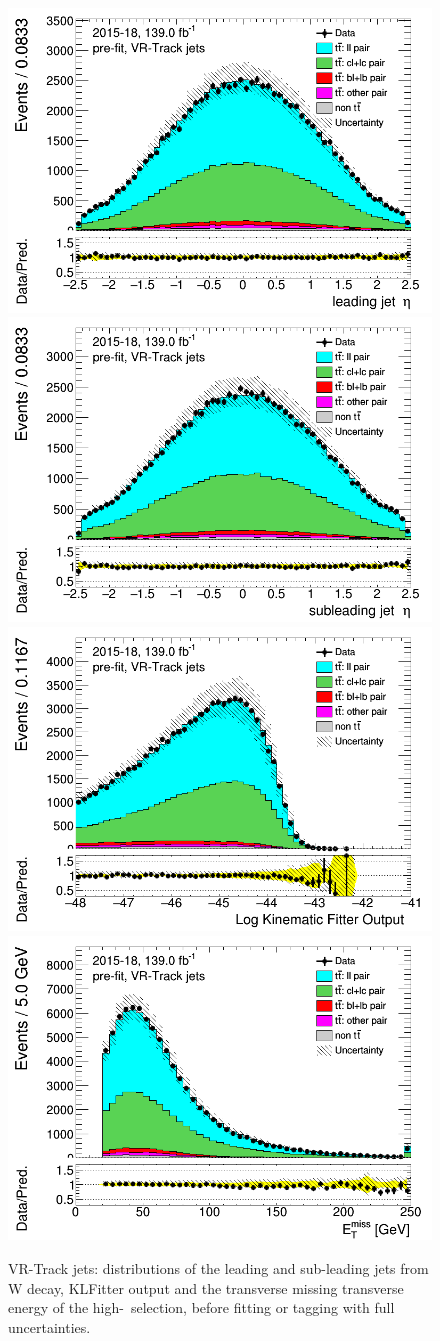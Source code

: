 \newpage	
\begin{figure}[H]
\includegraphics[width=.45\textwidth]{FTAG_plots/pretagNoRwnewonlyVRJetsall/DataMC_h_J0_etatrackjet.png}
\includegraphics[width=.45\textwidth]{FTAG_plots/pretagNoRwnewonlyVRJetsall/DataMC_h_J1_etatrackjet.png}\\
\includegraphics[width=.45\textwidth]{FTAG_plots/pretagNoRwnewonlyVRJetsall/DataMC_h_LLRtrackjet.png}
\includegraphics[width=.45\textwidth]{FTAG_plots/pretagNoRwnewonlyVRJetsall/DataMC_h_METtrackjet.png}\\

\caption{VR-Track jets: distributions of the leading and sub-leading jets 
from W decay, KLFitter output and the transverse missing transverse 
energy of the high-\pt\ selection, before fitting or tagging with 
full uncertainties.} \label{fig:highpT_jets_VRJets}
\end{figure}



